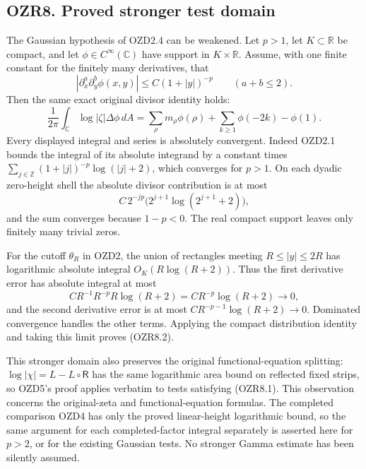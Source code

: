 \subsection{OZR8. Proved stronger test
domain}\label{ozr8.-proved-stronger-test-domain}

The Gaussian hypothesis of OZD2.4 can be weakened. Let \(p>1\), let
\(K\subset\mathbb R\) be compact, and let
\(\phi\in C^\infty(\mathbb C)\) have support in \(K\times\mathbb R\).
Assume, with one finite constant for the finitely many derivatives, that
\[
|\partial_x^a\partial_y^b\phi(x,y)|
\le C(1+|y|)^{-p}\qquad(a+b\le2).
\tag{OZR8.1}
\] Then the same exact original divisor identity holds: \[
\frac1{2\pi}\int_{\mathbb C}\log|\zeta|\Delta\phi\,dA
=\sum_\rho m_\rho\phi(\rho)+\sum_{k\ge1}\phi(-2k)-\phi(1).
\tag{OZR8.2}
\] Every displayed integral and series is absolutely convergent. Indeed
OZD2.1 bounds the integral of its absolute integrand by a constant times
\(\sum_{j\in\mathbb Z}(1+|j|)^{-p}\log(|j|+2)\), which converges for
\(p>1\). On each dyadic zero-height shell the absolute divisor
contribution is at most \[
C\,2^{-jp}\bigl(2^{j+1}\log(2^{j+1}+2)\bigr),
\] and the sum converges because \(1-p<0\). The real compact support
leaves only finitely many trivial zeros.

For the cutoff \(\theta_R\) in OZD2, the union of rectangles meeting
\(R\le|y|\le2R\) has logarithmic absolute integral \(O_K(R\log(R+2))\).
Thus the first derivative error has absolute integral at most \[
C R^{-1}R^{-p}R\log(R+2)=C R^{-p}\log(R+2)\longrightarrow0,
\] and the second derivative error is at most
\(C R^{-p-1}\log(R+2)\to0\). Dominated convergence handles the other
terms. Applying the compact distribution identity and taking this limit
proves (OZR8.2).

This stronger domain also preserves the original functional-equation
splitting: \(\log|\chi|=L-L\circ\mathsf R\) has the same logarithmic
area bound on reflected fixed strips, so OZD5's proof applies verbatim
to tests satisfying (OZR8.1). This observation concerns the
original-zeta and functional-equation formulas. The completed comparison
OZD4 has only the proved linear-height logarithmic bound, so the same
argument for each completed-factor integral separately is asserted here
for \(p>2\), or for the existing Gaussian tests. No stronger Gamma
estimate has been silently assumed.

